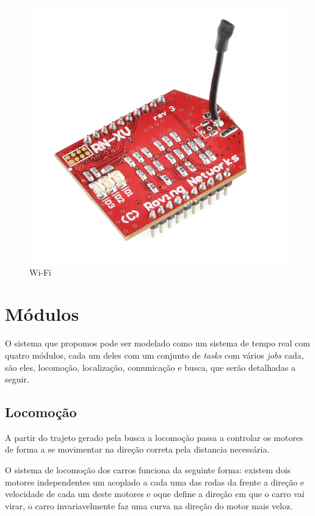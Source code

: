 \documentclass{abnt}
\begin{document}
\begin{itemize}
            \begin{figure}[ht!]
             \centering
             \includegraphics[scale=0.3]{WiFly.jpg}
             \caption{Wi-Fi  \label{WiFi}}
         \end{figure}

\end{itemize}
\section{Módulos}
        O sistema que propomos pode ser modelado como um sistema de tempo real com
        quatro módulos, cada um deles com um conjunto de \textit{tasks} com vários \textit{jobs} cada, são eles,
        locomoção, localização, comunicação e busca, que serão detalhadas a  seguir. 

        \subsection{Locomoção} 
         A partir do trajeto gerado pela busca a locomoção passa a controlar os
         motores de forma a se movimentar na direção correta pela distancia
         necessária. 
         
         O sistema de locomoção dos carros funciona da seguinte
         forma: existem dois motores independentes um acoplado a cada uma das
         rodas da frente a direção e velocidade de cada um deste motores e oque
         define a direção em que o carro vai virar, o carro invariavelmente faz
         uma curva na direção do motor mais veloz.
\end{document}
